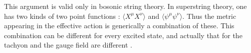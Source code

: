 \documentclass[a4paper,12pt]{article}
\begin{document}
This argument is valid only in bosonic string theory. In 
superstring theory, one has  two kinds of two point functions :  
$\langle X^{\mu} X^{\nu} \rangle$ and 
$\langle\psi^{\mu} \psi^{\nu} \rangle$. Thus the metric appearing in the
effective action is generically a combination of these. This combination
can be different for every excited state, and actually 
that for the tachyon and the gauge field are different 
\cite{Andreev}. 




\newcommand{\J}[4]{{\sl #1} {\bf #2} (#3) #4}
\newcommand{\andJ}[3]{{\bf #1} (#2) #3}
\newcommand{\AP}{Ann.\ Phys.\ (N.Y.)}
\newcommand{\MPL}{Mod.\ Phys.\ Lett.}
\newcommand{\NP}{Nucl.\ Phys.}
\newcommand{\PL}{Phys.\ Lett.}
\newcommand{\PR}{ Phys.\ Rev.}
\newcommand{\PRL}{Phys.\ Rev.\ Lett.}
\newcommand{\PTP}{Prog.\ Theor.\ Phys.}
\newcommand{\hep}[1]{{\tt hep-th/{#1}}}
\end{document}
